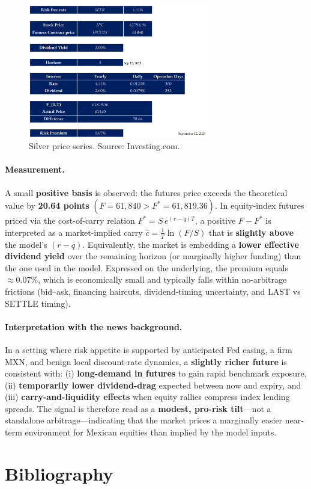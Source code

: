 \documentclass[10pt,a4paper]{article} %
\let\oldsection\section
\renewcommand{\section}{%
      \clearpage
      \thispagestyle{myfancy}%
      \oldsection
    }
\begin{document}
\begin{figure}[h]
\centering
\includegraphics[width=0.7\textwidth]{figures/ipc.png}
\caption{Silver price series. Source: Investing.com.}
\end{figure}

\paragraph{Measurement.} A small \textbf{positive basis} is observed: the futures price exceeds the theoretical value by \textbf{20.64 points} $(F=61{,}840 > F^{*}=61{,}819.36)$. In equity-index futures priced via the cost-of-carry relation $F^{*}=S\,e^{(r-q)T}$, a positive $F-F^{*}$ is interpreted as a market-implied carry $\hat{c} = \tfrac{1}{T}\ln(F/S)$ that is \textbf{slightly above} the model’s $(r-q)$. Equivalently, the market is embedding a \textbf{lower effective dividend yield} over the remaining horizon (or marginally higher funding) than the one used in the model. Expressed on the underlying, the premium equals \textbf{$\approx 0.07\%$}, which is economically small and typically falls within no-arbitrage frictions (bid–ask, financing haircuts, dividend-timing uncertainty, and LAST vs SETTLE timing).

\paragraph{Interpretation with the news background.} In a setting where risk appetite is supported by anticipated Fed easing, a firm MXN, and benign local discount-rate dynamics, a \textbf{slightly richer future} is consistent with: (i) \textbf{long-demand in futures} to gain rapid benchmark exposure, (ii) \textbf{temporarily lower dividend-drag} expected between now and expiry, and (iii) \textbf{carry-and-liquidity effects} when equity rallies compress index lending spreads. The signal is therefore read as a \textbf{modest, pro-risk tilt}—not a standalone arbitrage—indicating that the market prices a marginally easier near-term environment for Mexican equities than implied by the model inputs.




\section{Bibliography}

\end{document}
